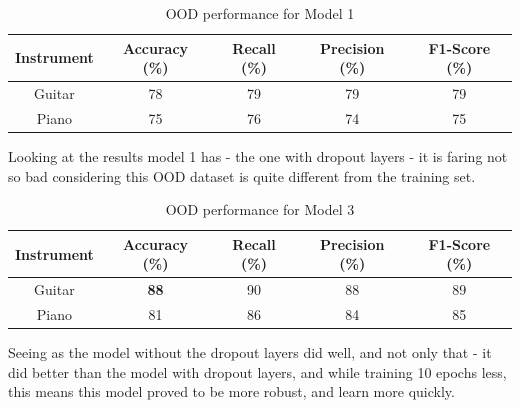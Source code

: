 \documentclass[a4paper]{article}
\begin{document}
\begin{table}[h]
\caption{OOD performance for Model 1}
\centering
\begin{adjustbox}{width=\linewidth}    
\begin{tabular}{c c c c c} %
\hline   
Instrument & Accuracy (\%) & Recall (\%) & Precision (\%) & F1-Score (\%) \\
\hline\hline
Guitar & 78 & 79 & 79 & 79\\
Piano & 75  & 76 & 74 & 75\\
\hline
\end{tabular}
\end{adjustbox}
\end{table}

Looking at the results model 1 has - the one with dropout layers - it is faring not so bad considering this OOD dataset is quite different from the training set.

\begin{table}[h]
\caption{OOD performance for Model 3}
\centering
\begin{adjustbox}{width=\linewidth}    
\begin{tabular}{c c c c c} %
\hline   
Instrument & Accuracy (\%) & Recall (\%) & Precision (\%) & F1-Score (\%) \\
\hline\hline
Guitar & \textbf{88} & 90 & 88 & 89\\
Piano & 81  & 86 & 84 & 85\\
\hline
\end{tabular}
\end{adjustbox}
\end{table}

Seeing as the model without the dropout layers did well, and not only that - it did better than the model with dropout layers, and while training 10 epochs less, this means this model proved to be more robust, and learn more quickly.


\end{document}
